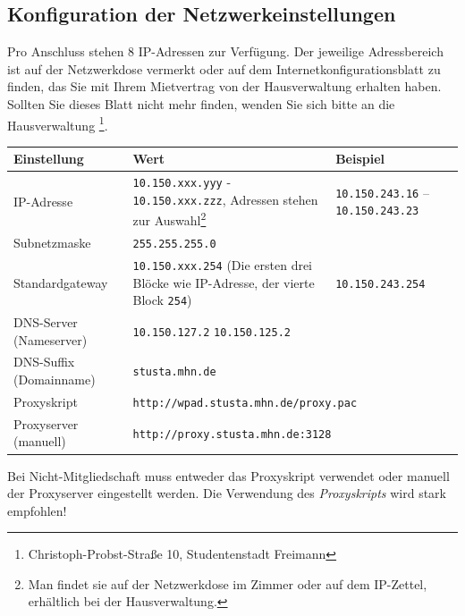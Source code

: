 \documentclass[a4paper,12pt]{scrartcl}
\begin{document}
\subsection*{Konfiguration der Netzwerkeinstellungen}

Pro Anschluss stehen 8 IP-Adressen zur Verfügung. Der jeweilige Adressbereich ist auf der Netzwerkdose vermerkt oder auf dem Internetkonfigurationsblatt zu finden, das Sie mit Ihrem Mietvertrag von der Hausverwaltung erhalten haben. Sollten Sie dieses Blatt nicht mehr finden, wenden Sie sich bitte an die Hausverwaltung \footnote{Christoph-Probst-Straße 10, Studentenstadt Freimann}.




\begin{center}
  \begin{tabularx}{\linewidth}{|lXp{.2\linewidth}|}
    \hline
    Einstellung & Wert & Beispiel \\
    \hline \hline
    IP-Adresse & \nolinkurl{10.150.xxx.yyy} - \nolinkurl{10.150.xxx.zzz}, \newline 8 Adressen stehen zur Auswahl\footnote{Man findet sie auf der Netzwerkdose im Zimmer oder auf dem IP-Zettel, erhältlich bei der Hausverwaltung.} & \nolinkurl{10.150.243.16} – \nolinkurl{10.150.243.23} \\
    \hline
    Subnetzmaske & \nolinkurl{255.255.255.0} & \\
    \hline
    Standardgateway & \nolinkurl{10.150.xxx.254} \newline (Die ersten drei Blöcke wie IP-Adresse, der vierte Block \nolinkurl{254}) & \nolinkurl{10.150.243.254} \\
    \hline
    DNS-Server (Nameserver) & \nolinkurl{10.150.127.2} \newline \nolinkurl{10.150.125.2} & \\
    \hline
    DNS-Suffix (Domainname) & \nolinkurl{stusta.mhn.de} & \\
    \hline
    Proxyskript & \multicolumn{2}{l|}{\nolinkurl{http://wpad.stusta.mhn.de/proxy.pac}} \\
    \hline
    Proxyserver (manuell) & \multicolumn{2}{l|}{\nolinkurl{http://proxy.stusta.mhn.de:3128}} \\
    \hline
  \end{tabularx}
\end{center}
Bei Nicht-Mitgliedschaft muss entweder das Proxyskript verwendet oder manuell der Proxyserver eingestellt werden. Die Verwendung des \emph{Proxyskripts} wird stark empfohlen!
\end{document}
